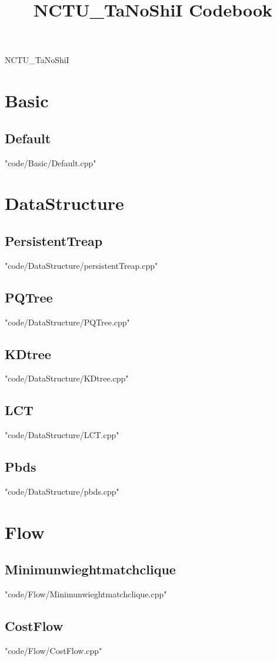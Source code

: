 \documentclass [8pt,a4paper,twocolumn]{article}
\title {NCTU\_TaNoShiI Codebook}
\begin{document}
\thispagestyle{fancy}
{ \Huge NCTU\_TaNoShiI}
\tableofcontents

\section{Basic}
\subsection{Default}
 {"code/Basic/Default.cpp"}
\section{DataStructure}
\subsection{PersistentTreap}
 {"code/DataStructure/persistentTreap.cpp"}
\subsection{PQTree}
 {"code/DataStructure/PQTree.cpp"}
\subsection{KDtree}
 {"code/DataStructure/KDtree.cpp"}
\subsection{LCT}
 {"code/DataStructure/LCT.cpp"}
\subsection{Pbds}
 {"code/DataStructure/pbds.cpp"}
\section{Flow}
\subsection{Minimunwieghtmatchclique}
 {"code/Flow/Minimunwieghtmatchclique.cpp"}
\subsection{CostFlow}
 {"code/Flow/CostFlow.cpp"}
\end{document}
